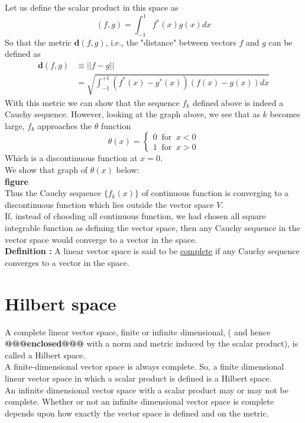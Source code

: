 Let us define the scalar product in this space as
\begin{equation}\label{eqn:2.92}
(f, g) = \int_{-1}^{1} f^*(x) g(x) dx
\end{equation}
So that the metric $\mathbf{d}(f, g)$, i.e., the "distance" between vectors $f$ and $g$ can be defined as
\begin{eqnarray}\label{eqn:2.93-2.94}
	\mathbf{d}(f, g) &\equiv ||f-g|| \\
	&= \sqrt{\int_{-1}^{+1}\left(f^*(x) - g^*(x)\right)\left(f(x) - g(x)\right) dx}
\end{eqnarray}
With this metric we can show that the sequence ${f_k}$ defined above is indeed a Cauchy sequence. However, looking at the graph above, we see that as $k$ becomes large, $f_k$ approaches the $\theta$ function
\begin{equation}\label{eqn:2.95}
\theta(x) = 
\begin{cases}
0 \ \text{ for } \ x < 0 \\
1 \ \text{ for } \ x > 0
\end{cases}
\end{equation}
Which is a discontinuous function at $x=0$.\\
We show that graph of $\theta(x)$ below:
\\
\textbf{figure}
\\
Thus the Cauchy sequence $\{f_k(x) \}$ of continuous function is converging to a discontinuous function which lies outside the vector space $V$.\\
If, instead of chooding all continuous function, we had chosen all square integrable function as defining the vector space, then any Cauchy sequence in the vector space would converge to a vector in the space.\\
\textbf{Definition : } A linear vector space is said to be \underline{complete} if any Cauchy sequence converges to a vector in the space.

\section{Hilbert space}
A complete linear vector space, finite or infinite dimensional, ( and hence \textbf{@@@enclosed@@@} with  a norm and metric induced by the scalar product), is called a Hilbert space.\\
A finite-dimensional vector space is always complete. So, a finite dimensional linear vector space in which a scalar product is defined is a Hilbert space.\\
An infinite dimensional vector space with a scalar product may or may not be complete. Whether or not an infinite dimensional vector space is complete depends upon how exactly the vector space is defined and on the metric.

